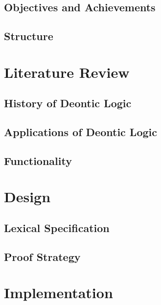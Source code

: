 \documentclass{l4proj}
\begin{document}
\section{Objectives and Achievements}

\section{Structure}

\chapter{Literature Review}

\section{History of Deontic Logic}

\section{Applications of Deontic Logic}

\section{Functionality}

\chapter{Design}

\section{Lexical Specification}

\section{Proof Strategy}

\chapter{Implementation}
\end{document}
